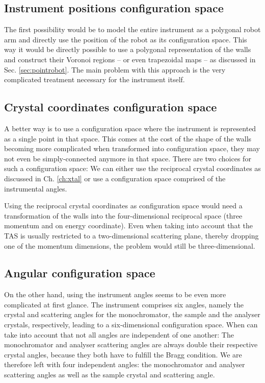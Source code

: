 \subsection*{Instrument positions configuration space}
The first possibility would be to model the entire instrument as a polygonal robot arm and directly use the position of the robot as
its configuration space. This way it would be directly possible to use a polygonal representation of the walls and construct their
Voronoi regions -- or even trapezoidal maps -- as discussed in Sec. \ref{sec:pointrobot}. The main problem with this approach is the
very complicated treatment necessary for the instrument itself.

\subsection*{Crystal coordinates configuration space}
A better way is to use a configuration space where the instrument is represented as a single point in that space. This comes at the 
cost of the shape of the walls becoming more complicated when transformed into configuration space, 
they may not even be simply-connected anymore in that space. There
are two choices for such a configuration space: We can either use the reciprocal crystal coordinates as discussed in Ch. \ref{ch:xtal}
or use a configuration space comprised of the instrumental angles.

Using the reciprocal crystal coordinates as configuration space would need a transformation of the walls into the four-dimensional
reciprocal space (three momentum and on energy coordinate). Even when taking into account that the TAS is usually restricted
to a two-dimensional scattering plane, thereby dropping one of the momentum dimensions, the problem would still be 
three-dimensional.

\subsection*{Angular configuration space}
On the other hand, using the instrument angles seems to be even more complicated at first glance. The instrument comprises
six angles, namely the crystal and scattering angles for the monochromator, the sample and the analyser crystals, respectively,
leading to a six-dimensional configuration space. When can take into account that not all angles are independent of one another:
The monochromator and analyser scattering angles are always double their respective crystal angles, because they both
have to fulfill the Bragg condition. We are therefore left with four independent angles: the monochromator and analyser 
scattering angles as well as the sample crystal and scattering angle. 

